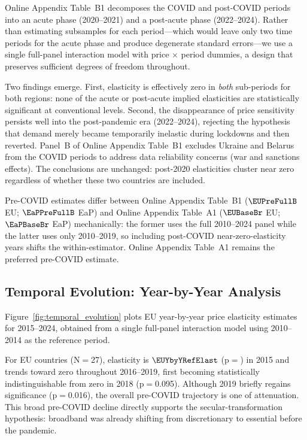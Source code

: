 Online Appendix Table~B1 decomposes the COVID and post-COVID periods into an acute phase
(2020--2021) and a post-acute phase (2022--2024). Rather than estimating subsamples for each
period---which would leave only two time periods for the acute phase and produce degenerate
standard errors---we use a single full-panel interaction model with price$\,\times\,$period
dummies, a design that preserves sufficient degrees of freedom throughout.

Two findings emerge. First, elasticity is effectively zero in \emph{both} sub-periods for
both regions: none of the acute or post-acute implied elasticities are statistically
significant at conventional levels. Second, the disappearance of price sensitivity persists
well into the post-pandemic era (2022--2024), rejecting the hypothesis that demand merely
became temporarily inelastic during lockdowns and then reverted. Panel~B of Online Appendix Table~B1 excludes Ukraine
and Belarus from the COVID periods to address data reliability concerns (war and sanctions
effects). The conclusions are unchanged: post-2020 elasticities cluster near zero regardless
of whether these two countries are included.

Pre-COVID estimates differ between Online Appendix Table~B1 ($\EUPreFullB$ EU; $\EaPPreFullB$ EaP) and Online Appendix Table~A1 ($\EUBaseBr$ EU; $\EaPBaseBr$ EaP) mechanically: the former uses the full 2010--2024 panel while the latter uses only 2010--2019, so including post-COVID near-zero-elasticity years shifts the within-estimator. Online Appendix Table~A1 remains the preferred pre-COVID estimate.

\subsection{Temporal Evolution: Year-by-Year Analysis}

Figure~\ref{fig:temporal_evolution} plots EU year-by-year price elasticity estimates for
2015--2024, obtained from a single full-panel interaction model using 2010--2014 as the
reference period.

For EU countries (N$=$27), elasticity is $\EUYbyYRefElast$ (p$=$\EUYbyYRefPval) in 2015 and
trends toward zero throughout 2016--2019, first becoming statistically indistinguishable
from zero in 2018 (p$=$0.095). Although 2019 briefly regains significance (p$=$0.016), the
overall pre-COVID trajectory is one of attenuation. This broad pre-COVID decline directly
supports the secular-transformation hypothesis: broadband was already shifting from
discretionary to essential before the pandemic.

